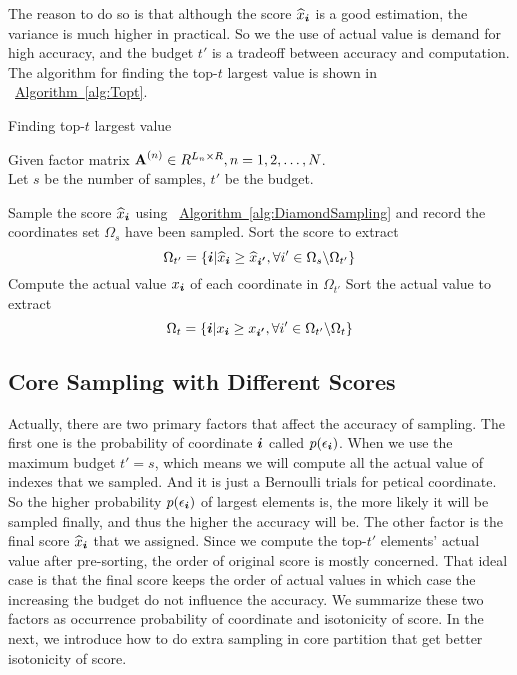 \documentclass[letterpaper]{article}
\newcommand{\V}[1]{{\bm{{\MakeLowercase{#1}}}}}
\newcommand{\M}[1]{{\bm{\mathbf{\MakeUppercase{#1}}}}}
\newcommand{\Alg}[1] {\hyperref[alg:#1] {Algorithm~\ref*{alg:#1}}}
\begin{document}
The reason to do so is that although the score $\widehat{x}_{\V{i}}$ is a good estimation, the variance is much higher in practical. So we the use of actual value is demand for high accuracy,
and the budget $t'$ is a tradeoff between accuracy and computation. The algorithm for finding the top-$t$ largest value is shown in ~\Alg{Topt}.
\begin{algorithm}[t]
    \caption{Finding top-$t$ largest value}
    \label{alg:Topt}
    Given factor matrix $\M{A}^{(n)}\in R^{L_n\times R}, n = 1,2,\ldots,N$.\\
    Let $s$ be the number of samples, $t'$ be the budget.
    \begin{algorithmic}[1]
    \State Sample the score $\widehat{x}_\V{i}$ using ~\Alg{DiamondSampling} and record the coordinates set $\Omega_s$ have been sampled.
    \State Sort the score to extract
    \[
        \Omega_{t'} = \{\V{i}|\widehat{x}_{\V{i}}\geq \widehat{x}_{\V{i'}},\forall i'\in \Omega_{s} \backslash \Omega_{t'}\}
    \]
    \State Compute the actual value $x_{\V{i}}$ of each coordinate in $\Omega_{t'}$
    \State Sort the actual value to extract
    \[
        \Omega_{t}=\{\V{i}|x_{\V{i}}\geq x_{\V{i'}},\forall i' \in \Omega_{t'} \backslash \Omega_{t} \}
    \]
    \end{algorithmic}
\end{algorithm}

\subsection{Core Sampling with Different Scores}

Actually, there are two primary factors that affect the accuracy of sampling.
The first one is the probability of coordinate $\V{i}$ called $p(\epsilon_{\V{i}})$.
When we use the maximum budget $t'=s$, 
which means we will compute all the actual value of indexes that we sampled. 
And it is just a Bernoulli trials for petical coordinate. 
So the higher probability $p(\epsilon_{\V{i}})$ of largest elements is,
the more likely it will be sampled finally,
and thus the higher the accuracy will be.
The other factor is the final score $\widehat{x}_{\V{i}}$ that we assigned.
Since we compute the top-$t'$ elements' actual value after pre-sorting,
the order of original score is mostly concerned.
That ideal case is that the final score keeps the order of actual values 
in which case the increasing the budget do not influence the accuracy.
We summarize these two factors as occurrence probability of coordinate and isotonicity of score.
In the next, we introduce how to do extra sampling in core partition that get better isotonicity of score.
\end{document}
